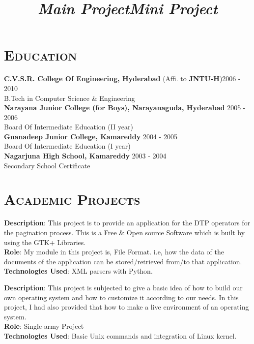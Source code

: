 \begin{resume}

\section{\textsc{Education}}

\textbf{C.V.S.R. College Of Engineering, Hyderabad} (Affi. to \textbf{JNTU-H})\hfill 2006 - 2010 \\
B.Tech in Computer Science \& Engineering\hfill \\
\newline
\textbf{Narayana Junior College (for Boys), Narayanaguda, Hyderabad} \hfill 2005 - 2006 \\ 
Board Of Intermediate Education (II year) \\
\textbf{Gnanadeep Junior College, Kamareddy} \hfill 2004 - 2005\\
Board Of Intermediate Education (I year) \\
\newline
\textbf{Nagarjuna High School, Kamareddy} \hfill 2003 - 2004 \\
Secondary School Certificate
\\



\section{\textsc{Academic Projects}}
\title{\em \textbf{Main Project}}
\begin{position}
\textbf{Description}: This project is to provide an application for
the DTP operators for the pagination process. This is a Free \& Open
source Software which is built by using the GTK+ Libraries.\\
\textbf{Role}: My module in this project is, File Format. i.e, how the
data of the documents of the application can be stored/retrieved
from/to that application.\\
\textbf{Technologies Used}: XML parsers with Python.\\
\end{position}
\title{\em \textbf{Mini Project}}
\begin{position}
\textbf{Description}: This project is subjected to give a basic idea
of how to build our own operating system and how  to  customize it
according to our needs. In this project, I had also provided that how
to make a live environment of an operating system.\\
\textbf{Role}: Single-army Project\\
\textbf{Technologies Used}: Basic Unix commands and integration of
Linux kernel.\\
\end{position}



\end{resume}
